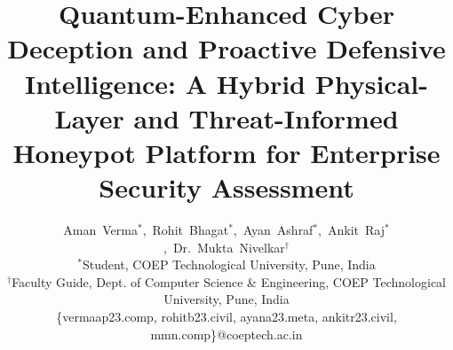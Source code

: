 \documentclass[journal,10pt]{IEEEtran}
\begin{document}
\title{Quantum-Enhanced Cyber Deception and Proactive Defensive Intelligence: A Hybrid Physical-Layer and Threat-Informed Honeypot Platform for Enterprise Security Assessment}

\author{
    Aman~Verma$^{*}$,~Rohit~Bhagat$^{*}$,~Ayan~Ashraf$^{*}$,~Ankit~Raj$^{*}$,~Dr.~Mukta~Nivelkar$^{\dagger}$\\
    \vspace{0.2em}
    $^{*}$Student, COEP Technological University, Pune, India\\
    $^{\dagger}$Faculty Guide, Dept. of Computer Science \& Engineering, COEP Technological University, Pune, India\\
    \vspace{0.2em}
    \small{\{vermaap23.comp, rohitb23.civil, ayana23.meta, ankitr23.civil, mmn.comp\}@coeptech.ac.in}
}

\maketitle
\end{document}
